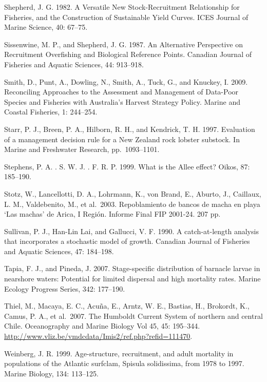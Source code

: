 \documentclass[12pt]{article}
\begin{document}
Shepherd, J. G. 1982. A Versatile New Stock-Recruitment Relationship for
Fisheries, and the Construction of Sustainable Yield Curves. ICES
Journal of Marine Science, 40: 67--75.

Sissenwine, M. P., and Shepherd, J. G. 1987. An Alternative Perspective
on Recruitment Overfishing and Biological Reference Points. Canadian
Journal of Fisheries and Aquatic Sciences, 44: 913--918.

Smith, D., Punt, A., Dowling, N., Smith, A., Tuck, G., and Knuckey, I.
2009. Reconciling Approaches to the Assessment and Management of
Data-Poor Species and Fisheries with Australia's Harvest Strategy
Policy. Marine and Coastal Fisheries, 1: 244--254.

Starr, P. J., Breen, P. A., Hilborn, R. H., and Kendrick, T. H. 1997.
Evaluation of a management decision rule for a New Zealand rock lobster
substock. In Marine and Freshwater Research, pp.~1093--1101.

Stephens, P. A. . S. W. J. . F. R. P. 1999. What is the Allee effect?
Oikos, 87: 185--190.

Stotz, W., Lancellotti, D. A., Lohrmann, K., von Brand, E., Aburto, J.,
Caillaux, L. M., Valdebenito, M., et al.~2003. Repoblamiento de bancos
de macha en playa `Las machas' de Arica, I Región. Informe Final FIP
2001-24. 207 pp.

Sullivan, P. J., Han-Lin Lai, and Gallucci, V. F. 1990. A
catch-at-length analysis that incorporates a stochastic model of growth.
Canadian Journal of Fisheries and Aquatic Sciences, 47: 184--198.

Tapia, F. J., and Pineda, J. 2007. Stage-specific distribution of
barnacle larvae in nearshore waters: Potential for limited dispersal and
high mortality rates. Marine Ecology Progress Series, 342: 177--190.

Thiel, M., Macaya, E. C., Acuña, E., Arntz, W. E., Bastias, H.,
Brokordt, K., Camus, P. A., et al.~2007. The Humboldt Current System of
northern and central Chile. Oceanography and Marine Biology Vol 45, 45:
195--344. \url{http://www.vliz.be/vmdcdata/Imis2/ref.php?refid=111470}.

Weinberg, J. R. 1999. Age-structure, recruitment, and adult mortality in
populations of the Atlantic surfclam, Spisula solidissima, from 1978 to
1997. Marine Biology, 134: 113--125.
\end{document}

